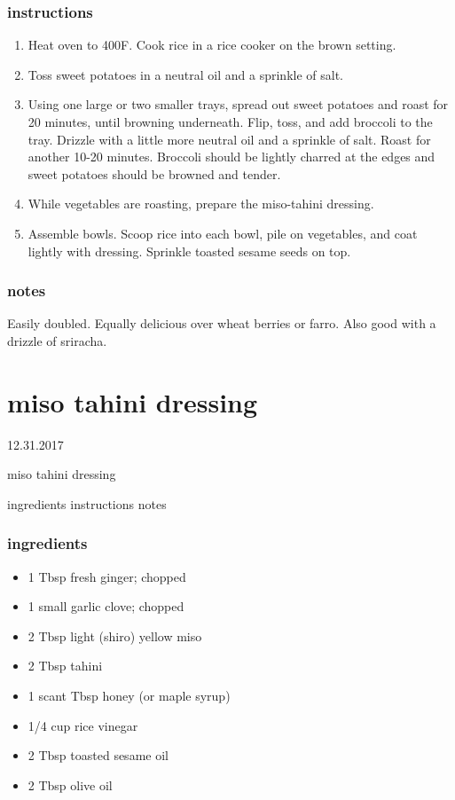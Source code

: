 \documentclass[]{book}
\providecommand{\tightlist}{%
  \setlength{\itemsep}{0pt}\setlength{\parskip}{0pt}}
\begin{document}
\hypertarget{instructions-5}{%
\subsection{instructions}\label{instructions-5}}

\begin{enumerate}
\def\labelenumi{\arabic{enumi}.}
\tightlist
\item
  Heat oven to 400F. Cook rice in a rice cooker on the brown setting.
\item
  Toss sweet potatoes in a neutral oil and a sprinkle of salt.
\item
  Using one large or two smaller trays, spread out sweet potatoes and roast for 20 minutes, until browning underneath.
  Flip, toss, and add broccoli to the tray. Drizzle with a little more neutral oil and a sprinkle of salt. Roast for
  another 10-20 minutes. Broccoli should be lightly charred at the edges and sweet potatoes should be browned and tender.
\item
  While vegetables are roasting, prepare the miso-tahini dressing.
\item
  Assemble bowls. Scoop rice into each bowl, pile on vegetables, and coat lightly with dressing. Sprinkle toasted
  sesame seeds on top.
\end{enumerate}

\hypertarget{notes-5}{%
\subsection{notes}\label{notes-5}}

Easily doubled. Equally delicious over wheat berries or farro. Also good with a drizzle of sriracha.

\hypertarget{miso-tahini-dressing}{%
\chapter{miso tahini dressing}\label{miso-tahini-dressing}}

12.31.2017

miso tahini dressing

ingredients \textbar{}
instructions \textbar{}
notes

\hypertarget{ingredients-6}{%
\subsection{ingredients}\label{ingredients-6}}

\begin{itemize}
\tightlist
\item
  1 Tbsp fresh ginger; chopped
\item
  1 small garlic clove; chopped
\item
  2 Tbsp light (shiro) yellow miso
\item
  2 Tbsp tahini
\item
  1 scant Tbsp honey (or maple syrup)
\item
  1/4 cup rice vinegar
\item
  2 Tbsp toasted sesame oil
\item
  2 Tbsp olive oil
\end{itemize}
\end{document}
